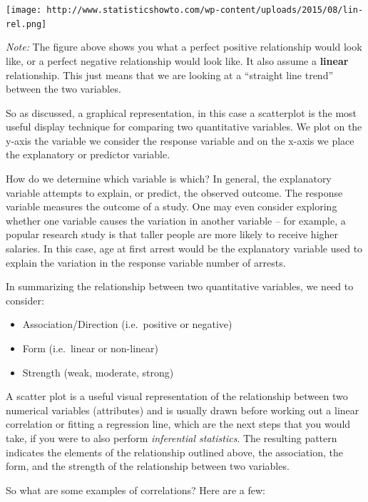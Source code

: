 \documentclass[
]{book}
\providecommand{\tightlist}{%
  \setlength{\itemsep}{0pt}\setlength{\parskip}{0pt}}
\begin{document}
\texttt{[image: http://www.statisticshowto.com/wp-content/uploads/2015/08/lin-rel.png]}

\emph{Note:}
The figure above shows you what a perfect positive relationship would look like, or a perfect negative relationship would look like. It also assume a \textbf{linear} relationship. This just means that we are looking at a ``straight line trend'' between the two variables.

So as discussed, a graphical representation, in this case a scatterplot is the most useful display technique for comparing two quantitative variables. We plot on the y-axis the variable we consider the response variable and on the x-axis we place the explanatory or predictor variable.

How do we determine which variable is which? In general, the explanatory variable attempts to explain, or predict, the observed outcome. The response variable measures the outcome of a study. One may even consider exploring whether one variable causes the variation in another variable -- for example, a popular research study is that taller people are more likely to receive higher salaries. In this case, age at first arrest would be the explanatory variable used to explain the variation in the response variable number of arrests.

In summarizing the relationship between two quantitative variables, we need to consider:

\begin{itemize}
\tightlist
\item
  Association/Direction (i.e.~positive or negative)
\item
  Form (i.e.~linear or non-linear)
\item
  Strength (weak, moderate, strong)
\end{itemize}

A scatter plot is a useful visual representation of the relationship between two numerical variables (attributes) and is usually drawn before working out a linear correlation or fitting a regression line, which are the next steps that you would take, if you were to also perform \emph{inferential statistics}. The resulting pattern indicates the elements of the relationship outlined above, the association, the form, and the strength of the relationship between two variables.

So what are some examples of correlations? Here are a few:
\end{document}
